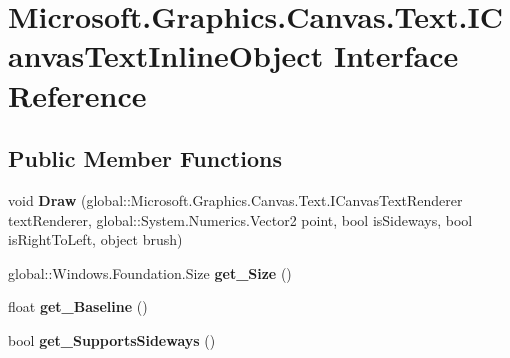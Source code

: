 \hypertarget{interface_microsoft_1_1_graphics_1_1_canvas_1_1_text_1_1_i_canvas_text_inline_object}{}\section{Microsoft.\+Graphics.\+Canvas.\+Text.\+I\+Canvas\+Text\+Inline\+Object Interface Reference}
\label{interface_microsoft_1_1_graphics_1_1_canvas_1_1_text_1_1_i_canvas_text_inline_object}
\subsection*{Public Member Functions}
\begin{DoxyCompactItemize}
\item 
\mbox{\label{interface_microsoft_1_1_graphics_1_1_canvas_1_1_text_1_1_i_canvas_text_inline_object_a00030cc74b4e29c52023687b4c2c3dc8}} 
void {\bfseries Draw} (global\+::\+Microsoft.\+Graphics.\+Canvas.\+Text.\+I\+Canvas\+Text\+Renderer text\+Renderer, global\+::\+System.\+Numerics.\+Vector2 point, bool is\+Sideways, bool is\+Right\+To\+Left, object brush)
\item 
\mbox{\label{interface_microsoft_1_1_graphics_1_1_canvas_1_1_text_1_1_i_canvas_text_inline_object_abdd46513229ae92a984fb38a29523eee}} 
global\+::\+Windows.\+Foundation.\+Size {\bfseries get\+\_\+\+Size} ()
\item 
\mbox{\label{interface_microsoft_1_1_graphics_1_1_canvas_1_1_text_1_1_i_canvas_text_inline_object_a60131c69d543427c072b80153dd7e4e9}} 
float {\bfseries get\+\_\+\+Baseline} ()
\item 
\mbox{\label{interface_microsoft_1_1_graphics_1_1_canvas_1_1_text_1_1_i_canvas_text_inline_object_a3b2557805b6f07e4b21599ebae515270}} 
bool {\bfseries get\+\_\+\+Supports\+Sideways} ()
\item 
\mbox{\label{interface_microsoft_1_1_graphics_1_1_canvas_1_1_text_1_1_i_canvas_text_inline_object_a7e6302b6465f8d6f7772aa52547cefc2}} 

\end{DoxyCompactItemize}
